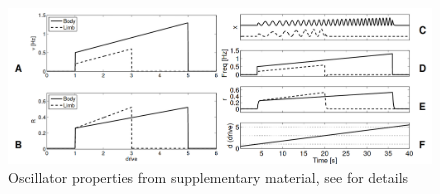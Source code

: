 \documentclass{cmc}
\begin{document}
\begin{figure}[H]
  \centering
  \includegraphics[width=1.0\textwidth]{figures/science_oscillator_properties}
  \caption{Oscillator properties from \cite{ijspeert2007swimming} supplementary
    material, see \cite{ijspeert2007swimming} for details}
  \label{fig:science_oscillator_properties}
\end{figure}



\label{sec:references}




\end{document}
